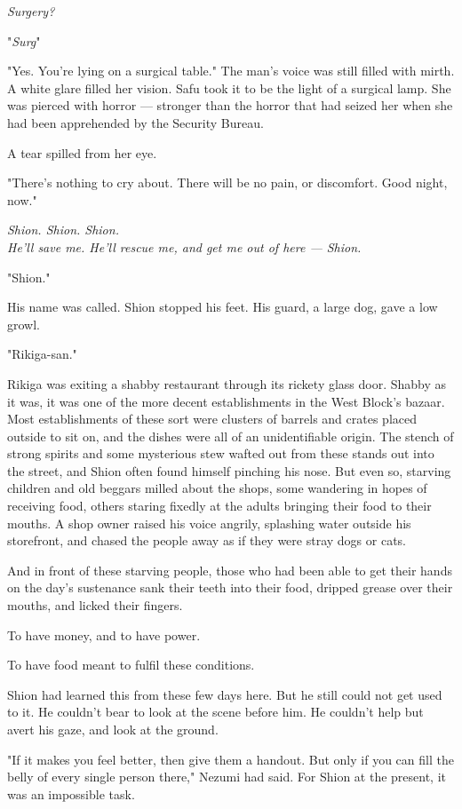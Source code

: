\emph{Surgery?}

"\emph{Surg\el }"

"Yes. You're lying on a surgical table." The man's voice was still
filled with mirth. A white glare filled her vision. Safu took it to be
the light of a surgical lamp. She was pierced with horror --- stronger
than the horror that had seized her when she had been apprehended by the
Security Bureau.

A tear spilled from her eye.

"There's nothing to cry about. There will be no pain, or discomfort.
Good night, now."

\emph{Shion. Shion. Shion.\\
	He'll save me. He'll rescue me, and get me out of here --- Shion.}

\mybreak

"Shion."

His name was called. Shion stopped his feet. His guard, a large dog,
gave a low growl.

"Rikiga-san."

Rikiga was exiting a shabby restaurant through its rickety glass door.
Shabby as it was, it was one of the more decent establishments in the
West Block's bazaar. Most establishments of these sort were clusters of
barrels and crates placed outside to sit on, and the dishes were all of
an unidentifiable origin. The stench of strong spirits and some
mysterious stew wafted out from these stands out into the street, and
Shion often found himself pinching his nose. But even so, starving
children and old beggars milled about the shops, some wandering in hopes
of receiving food, others staring fixedly at the adults bringing their
food to their mouths. A shop owner raised his voice angrily, splashing
water outside his storefront, and chased the people away as if they were
stray dogs or cats.

And in front of these starving people, those who had been able to get
their hands on the day's sustenance sank their teeth into their food,
dripped grease over their mouths, and licked their fingers.

To have money, and to have power.

To have food meant to fulfil these conditions.

Shion had learned this from these few days here. But he still could not
get used to it. He couldn't bear to look at the scene before him. He
couldn't help but avert his gaze, and look at the ground.

"If it makes you feel better, then give them a handout. But only if you
can fill the belly of every single person there," Nezumi had said. For
Shion at the present, it was an impossible task.

